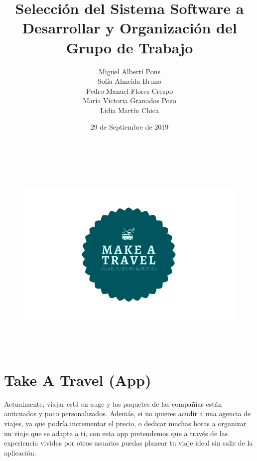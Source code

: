 \documentclass[11pt]{article}
\begin{document}
\begin{titlepage}
\title{\textbf{Selección del Sistema Software a Desarrollar y Organización del Grupo de Trabajo}}
\author{
Miguel Albertí Pons\\
Sofía Almeida Bruno\\
Pedro Manuel Flores Crespo\\
María Victoria Granados Pozo\\
Lidia Martín Chica
}
\date{29 de Septiembre de 2019}


\begin{figure}[h]
\includegraphics[width=15cm, height=10cm] {Logo}
\centering
\end{figure}
\end{titlepage}






\maketitle

\newpage
\section {Take A Travel (App)}
Actualmente, viajar está en auge y los paquetes de las compañías están anticuados y poco personalizados. Además, si no quieres acudir a una agencia de viajes, ya que podría incrementar el precio, o dedicar muchas horas a organizar un viaje que se adapte a ti, con esta app pretendemos que a través de las experiencia vividas por otros usuarios puedas planear tu viaje ideal sin salir de la aplicación.
\end{document}
